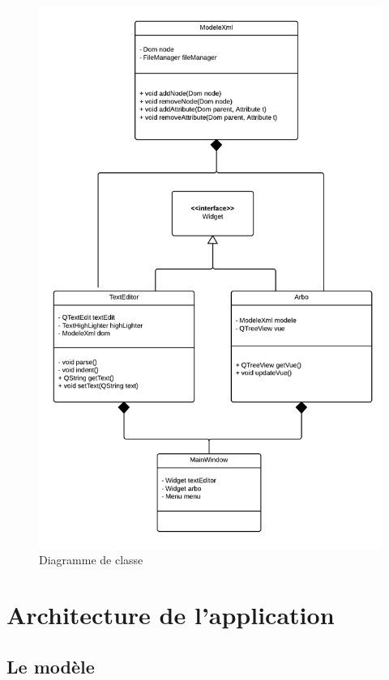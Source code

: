 \begin{figure}[h!]
\begin{minipage}[b]{\linewidth}
\centering \includegraphics[scale=0.4]{images/classes.png}
\caption{Diagramme de classe}
\label{diag_classe}
\end{minipage}
\end{figure}



\section{Architecture de l'application}
\subsection{Le modèle}

